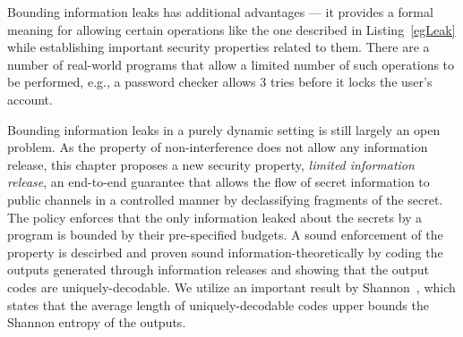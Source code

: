 Bounding information leaks has additional advantages --- it provides 
a formal meaning for allowing certain operations like the one 
described in Listing~\ref{egLeak} while establishing important
security properties related to them. There are a number of 
real-world programs that allow a limited number of such 
operations to be performed, e.g., a password checker allows $3$ tries
before it locks the user's account. 

Bounding information leaks in a purely dynamic setting is still largely 
an open problem. As the property of non-interference does not allow 
any information release, this chapter proposes a new security 
property, \emph{limited information release}, an end-to-end guarantee 
that allows the flow of secret information to public channels in a 
controlled manner by declassifying fragments of the secret. The 
policy enforces that the only information leaked about the secrets 
by a program is bounded by their pre-specified budgets. 
A sound enforcement of the property is descirbed and proven sound 
information-theoretically by coding the outputs generated through
information releases and showing that the output codes are
uniquely-decodable. We utilize an important result by
Shannon~, which states  that the average length of
uniquely-decodable codes upper bounds the Shannon entropy of the
outputs. 







